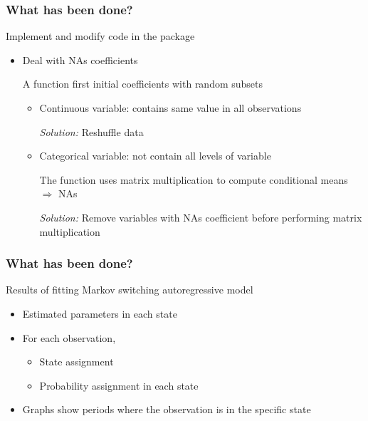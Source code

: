 \documentclass{beamer}
\begin{document}
\begin{frame}
\frametitle{What has been done?}
Implement and modify code in the package
\begin{itemize}
	\item Deal with NAs coefficients
	
	A function first initial coefficients with random subsets
	
	\begin{itemize}	
		\item Continuous variable: contains same value in all observations
		
		\vspace{2pt}
		
		\textit{Solution:} Reshuffle data
		
		\vspace{5pt}
		
		\item Categorical variable: not contain all levels of variable
		
		\vspace{2pt}
		
		The function uses matrix multiplication to compute conditional means $\Rightarrow$ NAs
		
		\vspace{2pt}
		
		\textit{Solution:} Remove variables with NAs coefficient before performing matrix multiplication
	\end{itemize}
\end{itemize}
\end{frame}

\begin{frame}
\frametitle{What has been done?}
Results of fitting Markov switching autoregressive model
\begin{itemize}
	\setlength\itemsep{1em}
	\item Estimated parameters in each state
	\item For each observation,
	\begin{itemize}
		\item State assignment
		\vspace{5pt}
		
		\item Probability assignment in each state
	\end{itemize}
	
	\item Graphs show periods where the observation is in the specific state
\end{itemize}

\end{frame}
\end{document}
